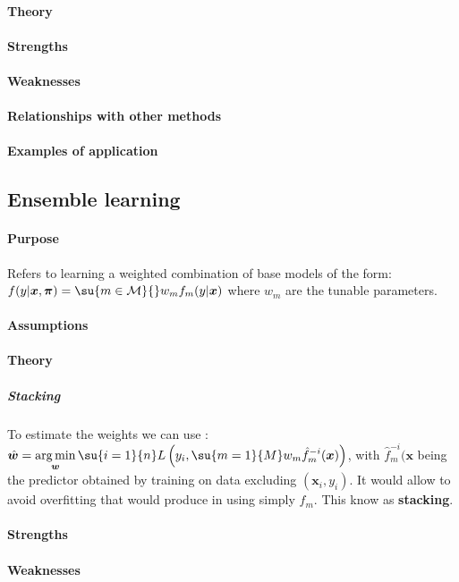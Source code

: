 \paragraph{Theory}
\paragraph{Strengths}
\paragraph{Weaknesses}
\paragraph{Relationships with other methods}
\paragraph{Examples of application}

\subsection{Ensemble learning}
\paragraph{Purpose}
Refers to learning a weighted combination of base models of the form:
$f(y|\bm{x},\bm{\pi}) = \su{m\in\mathcal{M}}{}w_{m}f_{m}(y|\bm{x})$ where $w_{m}$ are
the tunable parameters.
\paragraph{Assumptions}
\paragraph{Theory}
\subparagraph{Stacking}
To estimate the weights we can use : $\hat{\bm{w}} = \displaystyle\argmin_{\bm{
w}}\su{i=1}{n}L\left(y_{i},\su{m=1}{M}w_{m}\hat{f}_{m}^{-i}(\bm{x})\right)$, with 
$\hat{f}_{m}^{-i}(\bm{x}$ being the predictor obtained by training on data excluding
$(\bm{x}_{i},y_{i})$. It would allow to avoid overfitting that would produce in using
simply $f_{m}$. This know as \textbf{stacking}.
\paragraph{Strengths}
\paragraph{Weaknesses}
